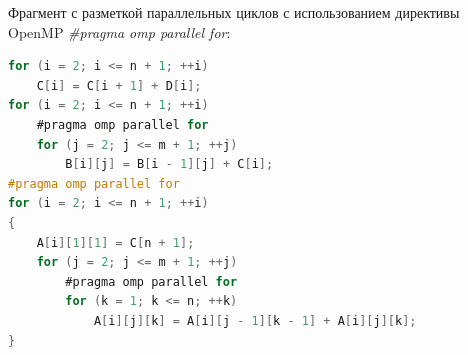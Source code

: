 \documentclass[oneside, final, 14pt]{extarticle}
\begin{document}
Фрагмент с разметкой параллельных циклов с использованием директивы OpenMP \emph{\#pragma omp parallel for}:

\begin{minipage}{0.9\linewidth}
\begin{lstlisting}[language=C, style=CStyle]
for (i = 2; i <= n + 1; ++i)
    C[i] = C[i + 1] + D[i];
for (i = 2; i <= n + 1; ++i)
    #pragma omp parallel for
    for (j = 2; j <= m + 1; ++j)
        B[i][j] = B[i - 1][j] + C[i];
#pragma omp parallel for
for (i = 2; i <= n + 1; ++i)
{
    A[i][1][1] = C[n + 1];
    for (j = 2; j <= m + 1; ++j)
        #pragma omp parallel for
        for (k = 1; k <= n; ++k)
            A[i][j][k] = A[i][j - 1][k - 1] + A[i][j][k];
}
\end{lstlisting}
\end{minipage}
\end{document}
